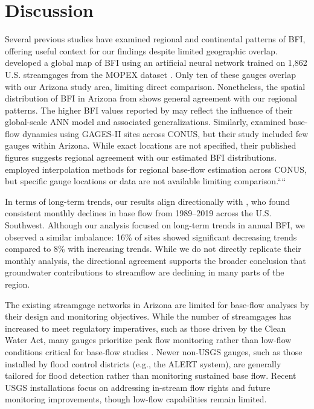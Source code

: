 \documentclass[
  authoryear,
  preprint,
  1p,
  onecolumn]{elsarticle}
\begin{document}
\section{Discussion}\label{discussion}

Several previous studies have examined regional and continental patterns
of BFI, offering useful context for our findings despite limited
geographic overlap. \citet{beck2013} developed a global map of BFI using
an artificial neural network trained on 1,862 U.S. streamgages from the
MOPEX dataset \citep{mopex_2006}. Only ten of these gauges overlap with
our Arizona study area, limiting direct comparison. Nonetheless, the
spatial distribution of BFI in Arizona from \citet{beck2013} shows
general agreement with our regional patterns. The higher BFI values
reported by \citet{beck2013} may reflect the influence of their
global-scale ANN model and associated generalizations. Similarly,
\citet{ayers2022} examined base-flow dynamics using GAGES-II sites
across CONUS, but their study included few gauges within Arizona. While
exact locations are not specified, their published figures suggests
regional agreement with our estimated BFI distributions.
\citet{santhi2008} employed interpolation methods for regional base-flow
estimation across CONUS, but specific gauge locations or data are not
available limiting comparison.````

In terms of long-term trends, our results align directionally with
\citet{ayers2022} , who found consistent monthly declines in base flow
from 1989--2019 across the U.S. Southwest. Although our analysis focused
on long-term trends in annual BFI, we observed a similar imbalance: 16\%
of sites showed significant decreasing trends compared to 8\% with
increasing trends. While we do not directly replicate their monthly
analysis, the directional agreement supports the broader conclusion that
groundwater contributions to streamflow are declining in many parts of
the region.

The existing streamgage networks in Arizona are limited for base-flow
analyses by their design and monitoring objectives. While the number of
streamgages has increased to meet regulatory imperatives, such as those
driven by the Clean Water Act, many gauges prioritize peak flow
monitoring rather than low-flow conditions critical for base-flow
studies \citep{flood-control2020}. Newer non-USGS gauges, such as those
installed by flood control districts (e.g., the ALERT system), are
generally tailored for flood detection rather than monitoring sustained
base flow. Recent USGS installations focus on addressing in-stream flow
rights and future monitoring improvements, though low-flow capabilities
remain limited.
\end{document}
